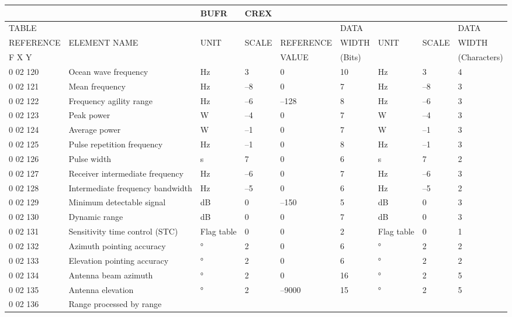 \begin{longtable}[]{@{}lllllllll@{}}
\toprule
& & BUFR & CREX & & & & &\tabularnewline
\midrule
\endhead
TABLE & & & & & DATA & & & DATA\tabularnewline
REFERENCE & ELEMENT NAME & UNIT & SCALE & REFERENCE & WIDTH & UNIT & SCALE & WIDTH\tabularnewline
F X Y & & & & VALUE & (Bits) & & & (Characters)\tabularnewline
0 02 120 & Ocean wave frequency & Hz & 3 & 0 & 10 & Hz & 3 & 4\tabularnewline
0 02 121 & Mean frequency & Hz & --8 & 0 & 7 & Hz & --8 & 3\tabularnewline
0 02 122 & Frequency agility range & Hz & --6 & --128 & 8 & Hz & --6 & 3\tabularnewline
0 02 123 & Peak power & W & --4 & 0 & 7 & W & --4 & 3\tabularnewline
0 02 124 & Average power & W & --1 & 0 & 7 & W & --1 & 3\tabularnewline
0 02 125 & Pulse repetition frequency & Hz & --1 & 0 & 8 & Hz & --1 & 3\tabularnewline
0 02 126 & Pulse width & s & 7 & 0 & 6 & s & 7 & 2\tabularnewline
0 02 127 & Receiver intermediate frequency & Hz & --6 & 0 & 7 & Hz & --6 & 3\tabularnewline
0 02 128 & Intermediate frequency bandwidth & Hz & --5 & 0 & 6 & Hz & --5 & 2\tabularnewline
0 02 129 & Minimum detectable signal & dB & 0 & --150 & 5 & dB & 0 & 3\tabularnewline
0 02 130 & Dynamic range & dB & 0 & 0 & 7 & dB & 0 & 3\tabularnewline
0 02 131 & Sensitivity time control (STC) & Flag table & 0 & 0 & 2 & Flag table & 0 & 1\tabularnewline
0 02 132 & Azimuth pointing accuracy & ° & 2 & 0 & 6 & ° & 2 & 2\tabularnewline
0 02 133 & Elevation pointing accuracy & ° & 2 & 0 & 6 & ° & 2 & 2\tabularnewline
0 02 134 & Antenna beam azimuth & ° & 2 & 0 & 16 & ° & 2 & 5\tabularnewline
0 02 135 & Antenna elevation & ° & 2 & --9000 & 15 & ° & 2 & 5\tabularnewline
\begin{minipage}[t]{0.08\columnwidth}\raggedright
0 02 136\strut
\end{minipage} & \begin{minipage}[t]{0.08\columnwidth}\raggedright
Range processed by range


\end{minipage}
\end{longtable}
